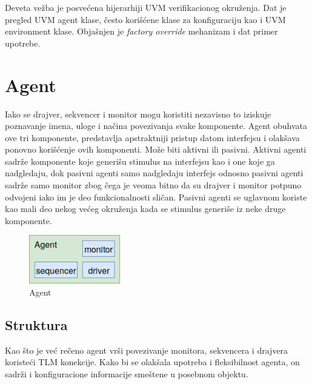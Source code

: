 %
% 

Deveta vežba je posvećena hijerarhiji UVM verifikacionog okruženja. Dat je
pregled UVM agent klase, često korišćene klase za konfiguraciju kao i UVM
environment klase. Objašnjen je \emph{factory override} mehanizam i dat primer
upotrebe.


\section{Agent}

Iako se drajver, sekvencer i monitor mogu koristiti nezavisno to iziskuje
poznavanje imena, uloge i načina povezivanja svake komponente. Agent obuhvata
ove tri komponente, predstavlja apstraktniji pristup datom interfejsu i olakšava
ponovno korišćenje ovih komponenti. Može biti aktivni ili pasivni. Aktivni
agenti sadrže komponente koje generišu stimulus na interfejsu kao i one koje ga
nadgledaju, dok pasivni agenti samo nadgledaju interfejs odnosno pasivni agenti
sadrže samo monitor zbog čega je veoma bitno da su drajver i monitor potpuno
odvojeni iako im je deo funkcionalnosti sličan. Pasivni agenti se uglavnom
koriste kao mali deo nekog većeg okruženja kada se stimulus generiše iz neke
druge komponente.

\begin{figure}[h!]
  \centering
  \includegraphics[width=40mm, scale=0.5]{img/v9_agent.png}
  \caption{Agent}
  \label{fig:agent}
\end{figure}


\subsection{Struktura}

Kao što je već rečeno agent vrši povezivanje monitora, sekvencera i drajvera
koristeći TLM konekcije. Kako bi se olakšala upotreba i fleksibilnost agenta, on
sadrži i konfiguracione informacije smeštene u posebnom objektu.\\

